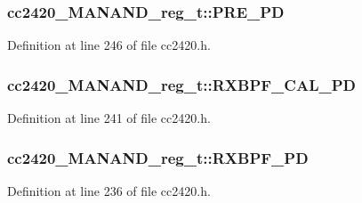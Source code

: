 \subsubsection[{\texorpdfstring{P\+R\+E\+\_\+\+PD}{PRE_PD}}]{ cc2420\+\_\+\+M\+A\+N\+A\+N\+D\+\_\+reg\+\_\+t\+::\+P\+R\+E\+\_\+\+PD}\hypertarget{structcc2420___m_a_n_a_n_d__reg__t_ad8d4ebe646c2348b30f19a74caa767b5}{}\label{structcc2420___m_a_n_a_n_d__reg__t_ad8d4ebe646c2348b30f19a74caa767b5}


Definition at line 246 of file cc2420.\+h.

\subsubsection[{\texorpdfstring{R\+X\+B\+P\+F\+\_\+\+C\+A\+L\+\_\+\+PD}{RXBPF_CAL_PD}}]{ cc2420\+\_\+\+M\+A\+N\+A\+N\+D\+\_\+reg\+\_\+t\+::\+R\+X\+B\+P\+F\+\_\+\+C\+A\+L\+\_\+\+PD}\hypertarget{structcc2420___m_a_n_a_n_d__reg__t_a0d248cc816a56f71dfdc0ee1c2eeccc3}{}\label{structcc2420___m_a_n_a_n_d__reg__t_a0d248cc816a56f71dfdc0ee1c2eeccc3}


Definition at line 241 of file cc2420.\+h.

\subsubsection[{\texorpdfstring{R\+X\+B\+P\+F\+\_\+\+PD}{RXBPF_PD}}]{ cc2420\+\_\+\+M\+A\+N\+A\+N\+D\+\_\+reg\+\_\+t\+::\+R\+X\+B\+P\+F\+\_\+\+PD}\hypertarget{structcc2420___m_a_n_a_n_d__reg__t_ad13de682df65231d5ab52de606d1bcf1}{}\label{structcc2420___m_a_n_a_n_d__reg__t_ad13de682df65231d5ab52de606d1bcf1}


Definition at line 236 of file cc2420.\+h.

